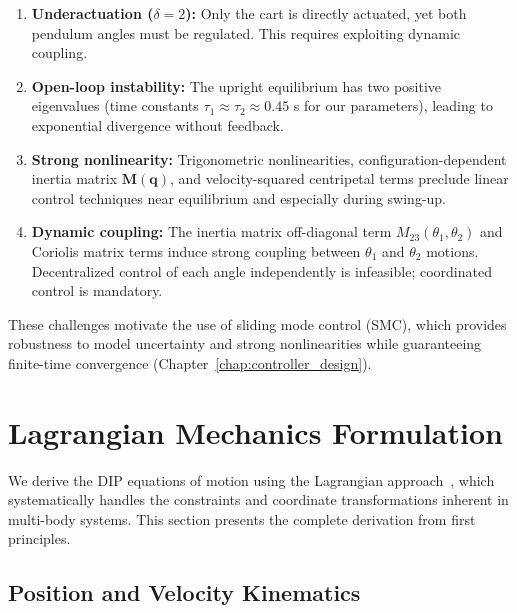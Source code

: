 \begin{enumerate}
\item \textbf{Underactuation ($\delta = 2$):} Only the cart is directly actuated, yet both pendulum angles must be regulated. This requires exploiting dynamic coupling.

\item \textbf{Open-loop instability:} The upright equilibrium has two positive eigenvalues (time constants $\tau_1 \approx \tau_2 \approx 0.45$ s for our parameters), leading to exponential divergence without feedback.

\item \textbf{Strong nonlinearity:} Trigonometric nonlinearities, configuration-dependent inertia matrix $\mathbf{M}(\mathbf{q})$, and velocity-squared centripetal terms preclude linear control techniques near equilibrium and especially during swing-up.

\item \textbf{Dynamic coupling:} The inertia matrix off-diagonal term $M_{23}(\theta_1, \theta_2)$ and Coriolis matrix terms induce strong coupling between $\theta_1$ and $\theta_2$ motions. Decentralized control of each angle independently is infeasible; coordinated control is mandatory.
\end{enumerate}

These challenges motivate the use of sliding mode control (SMC), which provides robustness to model uncertainty and strong nonlinearities while guaranteeing finite-time convergence (Chapter~\ref{chap:controller_design}).

\section{Lagrangian Mechanics Formulation}
\label{sec:lagrangian_formulation}

We derive the DIP equations of motion using the Lagrangian approach~\cite{spong2006robot}, which systematically handles the constraints and coordinate transformations inherent in multi-body systems. This section presents the complete derivation from first principles.

\subsection{Position and Velocity Kinematics}

